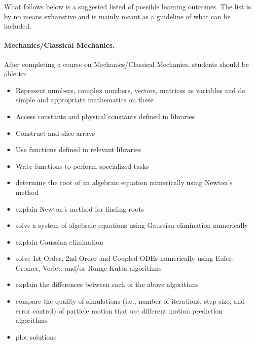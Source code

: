 \documentclass[graybox,envcountchap,sectrefs]{svmult}
\begin{document}
What follows below is a suggested listed of possible learning outcomes. The list is by no means exhaustive and is mainly meant as a guideline of what can be included.


\paragraph{Mechanics/Classical Mechanics.}
After completing a course on Mechanics/Classical Mechanics, students should be able to:
\begin{itemize}
\item Represent numbers, complex numbers, vectors, matrices as variables and do simple and appropriate mathematics on these

\item Access constants and physical constants defined in libraries

\item Construct and slice arrays

\item Use functions defined in relevant libraries

\item Write functions to perform specialized tasks

\item determine the root of an algebraic equation numerically using Newton's method

\item explain Newton's method for finding roots

\item solve a system of algebraic equations using Gaussian elimination numerically

\item explain Gaussian elimination

\item solve 1st Order, 2nd Order and Coupled ODEs numerically using Euler-Cromer, Verlet, and/or Runge-Kutta algorithms

\item explain the differences between each of the above algorithms

\item compare the quality of simulations (i.e., number of iterations, step size, and error control) of particle motion that use different motion prediction algorithms

\item plot solutions
\end{itemize}
\end{document}
